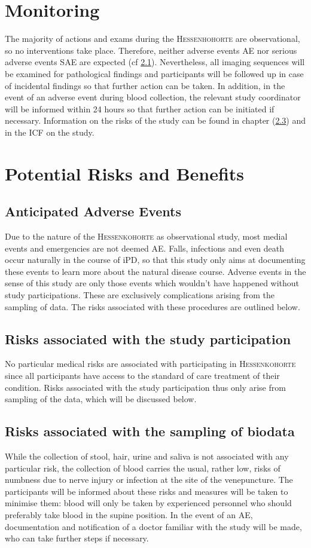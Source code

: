 \section{Monitoring}
The majority of actions and exams during the \textsc{Hessenhohorte} are observational, so no interventions take place. Therefore, neither adverse events \ac{AE} nor serious adverse events \ac{SAE} are expected (cf \ref{subsec:anticipated_AE}). Nevertheless, all imaging sequences will be examined for pathological findings and participants will be followed up in case of incidental findings so that further action can be taken. In addition, in the event of an adverse event during blood collection, the relevant study coordinator will be informed within 24 hours so that further action can be initiated if necessary. Information on the risks of the study can be found in chapter (\ref{}) and in the \ac{ICF} on the study.  

\section{Potential Risks and Benefits}
\subsection{Anticipated Adverse Events}
\label{subsec:anticipated_AE}
Due to the nature of the \textsc{Hessenkohorte} as observational study, most medial events and emergencies are not deemed \acl{AE}. Falls, infections and even death occur naturally in the course of \ac{iPD}, so that this study only aims at documenting these events to learn more about the natural disease course. Adverse events in the sense of this study are only those events which wouldn't have happened without study participations. These are exclusively complications arising from the sampling of data. The risks associated with these procedures are outlined below.

\subsection{Risks associated with the study participation}
No particular medical risks are associated with participating in \textsc{Hessenkohorte} since all participants have access to the standard of
care treatment of their condition. Risks associated with the study participation thus only arise from sampling of the data, which will be
discussed below.

\subsection{Risks associated with the sampling of biodata}
While the collection of stool, hair, urine and saliva is not associated with any particular risk, the collection of blood carries the usual, rather low, risks of numbness due to nerve injury or infection at the site of the venepuncture. The participants will be informed about these risks and measures will be taken to minimise them: blood will only be taken by experienced personnel who should preferably take blood in the supine position. In the event of an \ac{AE}, documentation and notification of a doctor familiar with the study will be made, who can take further steps if necessary. 

